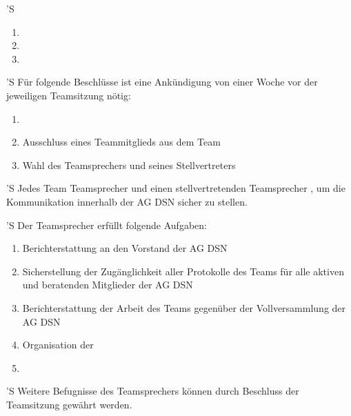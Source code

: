 \documentclass[draft,parskip=half-,DIV=12,mpinclude]{scrartcl}
\begin{document}
\begin{contract}
'S 
\begin{enumerate}
  \item {}
  \item {}
  \item {}
\end{enumerate}

'S Für folgende Beschlüsse ist eine Ankündigung von einer Woche vor der jeweiligen Teamsitzung nötig:
\begin{enumerate}
  \item {}
  \item Ausschluss eines Teammitglieds aus dem Team
  \item Wahl des Teamsprechers und seines Stellvertreters
\end{enumerate}


'S Jedes Team  Teamsprecher und einen stellvertretenden Teamsprecher , um die Kommunikation innerhalb der AG DSN sicher zu stellen.

'S Der Teamsprecher erfüllt folgende Aufgaben:
\begin{enumerate}
  \item Berichterstattung an den Vorstand der AG DSN
  \item Sicherstellung der Zugänglichkeit aller Protokolle des Teams für alle aktiven und beratenden Mitglieder der AG DSN
  \item Berichterstattung der Arbeit des Teams gegenüber der Vollversammlung der AG DSN
  \item Organisation der 
  \item {}
\end{enumerate}

'S Weitere Befugnisse des Teamsprechers können durch Beschluss der Teamsitzung gewährt werden.


\end{contract}
\end{document}

